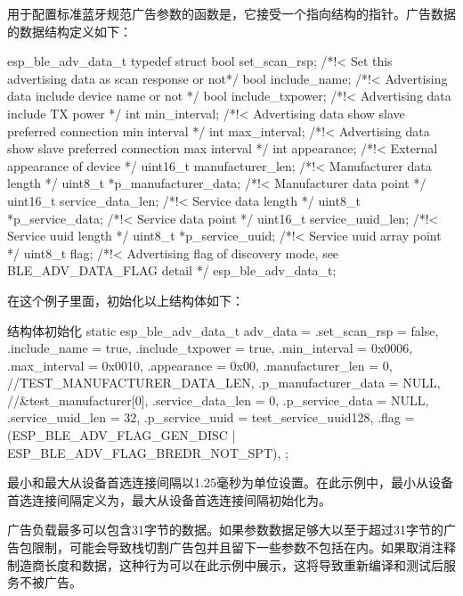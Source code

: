\documentclass[lang=cn,newtx,10pt,scheme=chinese]{elegantbook}
\begin{document}
用于配置标准蓝牙规范广告参数的函数是，它接受一个指向结构的指针。广告数据的数据结构定义如下：

\begin{mycode}{esp\_ble\_adv\_data\_t}
typedef struct {
    bool set_scan_rsp;            /*!< Set this advertising data as scan response or not*/
    bool include_name;            /*!< Advertising data include device name or not */
    bool include_txpower;         /*!< Advertising data include TX power */
    int min_interval;             /*!< Advertising data show slave preferred connection min interval */
    int max_interval;             /*!< Advertising data show slave preferred connection max interval */
    int appearance;               /*!< External appearance of device */
    uint16_t manufacturer_len;    /*!< Manufacturer data length */
    uint8_t *p_manufacturer_data; /*!< Manufacturer data point */
    uint16_t service_data_len;    /*!< Service data length */
    uint8_t *p_service_data;      /*!< Service data point */
    uint16_t service_uuid_len;    /*!< Service uuid length */
    uint8_t *p_service_uuid;      /*!< Service uuid array point */
    uint8_t flag;                 /*!< Advertising flag of discovery mode, see BLE_ADV_DATA_FLAG detail */
} esp_ble_adv_data_t;
\end{mycode}

在这个例子里面，初始化以上结构体如下：

\begin{mycode}{结构体初始化}
static esp_ble_adv_data_t adv_data = {
    .set_scan_rsp = false,
    .include_name = true,
    .include_txpower = true,
    .min_interval = 0x0006,
    .max_interval = 0x0010,
    .appearance = 0x00,
    .manufacturer_len = 0, //TEST_MANUFACTURER_DATA_LEN,
    .p_manufacturer_data =  NULL, //&test_manufacturer[0],
    .service_data_len = 0,
    .p_service_data = NULL,
    .service_uuid_len = 32,
    .p_service_uuid = test_service_uuid128,
    .flag = (ESP_BLE_ADV_FLAG_GEN_DISC | ESP_BLE_ADV_FLAG_BREDR_NOT_SPT),
};
\end{mycode}

最小和最大从设备首选连接间隔以1.25毫秒为单位设置。在此示例中，最小从设备首选连接间隔定义为，最大从设备首选连接间隔初始化为。

广告负载最多可以包含31字节的数据。如果参数数据足够大以至于超过31字节的广告包限制，可能会导致栈切割广告包并且留下一些参数不包括在内。如果取消注释制造商长度和数据，这种行为可以在此示例中展示，这将导致重新编译和测试后服务不被广告。
\end{document}
